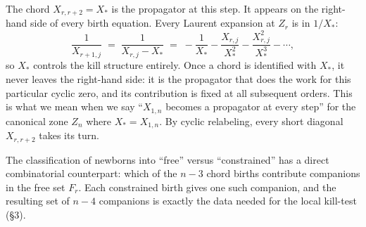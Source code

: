 \documentclass[11pt]{article}
\theoremstyle{definition}
\begin{document}
The chord $X_{r,r+2} = X_*$ is the propagator at this step. It appears on the right-hand side of every birth equation. Every Laurent expansion at $Z_r$ is in $1/X_*$:
\[
\frac{1}{X_{r+1,j}} \;=\; \frac{1}{X_{r,j} - X_*} \;=\; -\frac{1}{X_*} - \frac{X_{r,j}}{X_*^2} - \frac{X_{r,j}^2}{X_*^3} - \cdots ,
\]
so $X_*$ controls the kill structure entirely. Once a chord is identified with $X_*$, it never leaves the right-hand side: it is the propagator that does the work for this particular cyclic zero, and its contribution is fixed at all subsequent orders. This is what we mean when we say ``$X_{1,n}$ becomes a propagator at every step'' for the canonical zone $Z_n$ where $X_* = X_{1,n}$. By cyclic relabeling, every short diagonal $X_{r,r+2}$ takes its turn.

The classification of newborns into ``free'' versus ``constrained'' has a direct combinatorial counterpart: which of the $n-3$ chord births contribute companions in the free set $F_r$. Each constrained birth gives one such companion, and the resulting set of $n-4$ companions is exactly the data needed for the local kill-test (\S3).

\medskip
\end{document}
